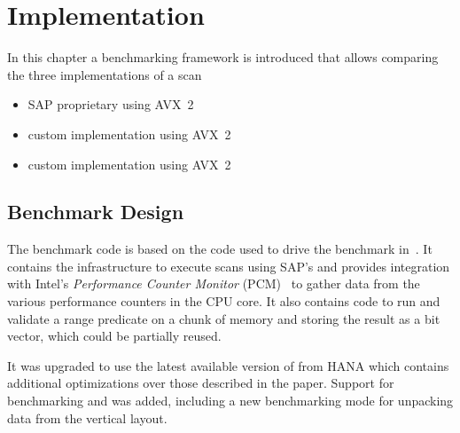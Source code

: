 \chapter{Implementation}

In this chapter a benchmarking framework is introduced that allows comparing the
three implementations of a scan

\begin{itemize}
  \item \simdscan{} SAP proprietary using AVX~2
  \item \bwv{} custom implementation using AVX~2
  \item \bs{} custom implementation using AVX~2
\end{itemize}

\section{Benchmark Design}

The benchmark code is based on the code used to drive the benchmark
in~\cite{AVX2-Scan}. It contains the infrastructure to execute scans using
SAP's \simdscan{} and provides integration with Intel's \emph{Performance
Counter Monitor} (PCM)~\cite{intelpcm} to gather data from the various
performance counters in the CPU core. It also contains code to run and validate
a range predicate on a chunk of memory and storing the result as a bit vector,
which could be partially reused.

It was upgraded to use the latest available version of \simdscan{} from HANA
which contains additional optimizations over those described in the paper.
Support for benchmarking \bwv{} and \bs{} was added, including a new
benchmarking mode for unpacking data from the vertical layout.

